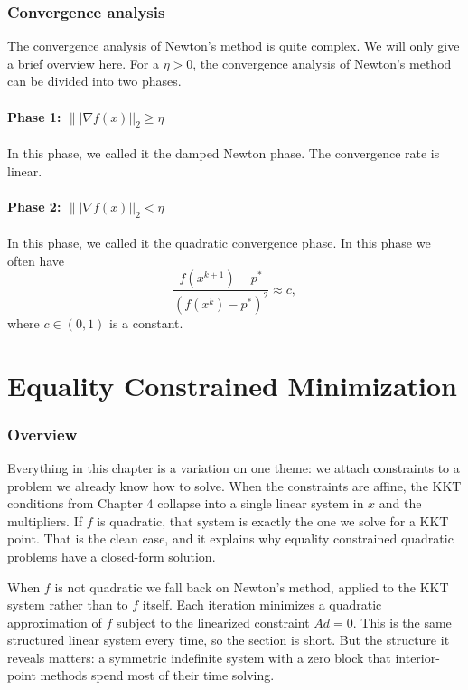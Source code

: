 \documentclass[lang=en,color=blue,mode=fancy,titlestyle=hang]{elegantbook}
\begin{document}
\subsection{Convergence analysis}
The convergence analysis of Newton's method is quite complex. We will only give a brief overview here.
For a $\eta > 0$, the convergence analysis of Newton's method can be divided into two phases.

\subsubsection{Phase 1: $\||\nabla f(x)||_2 \geq \eta$} In this phase, we called it the damped Newton phase.
The convergence rate is linear.

\subsubsection{Phase 2: $\||\nabla f(x)||_2 < \eta$} In this phase, we called it the quadratic
convergence phase. In this phase we often have
\[
\frac{f(x^{k+1}) - p^*}{{(f(x^k) - p^*)}^2} \approx c,
\]
where $c \in (0, 1)$ is a constant.

\chapter{Equality Constrained Minimization}

\subsection*{Overview}

Everything in this chapter is a variation on one theme: we attach constraints to a problem
we already know how to solve. When the constraints are affine, the KKT conditions from
Chapter 4 collapse into a single linear system in $x$ and the multipliers. If $f$ is
quadratic, that system is exactly the one we solve for a KKT point. That is the clean case,
and it explains why equality constrained quadratic problems have a closed-form solution.

When $f$ is not quadratic we fall back on Newton's method, applied to the KKT system rather
than to $f$ itself. Each iteration minimizes a quadratic approximation of $f$ subject to
the linearized constraint $Ad = 0$. This is the same structured linear system every time,
so the section is short. But the structure it reveals matters: a symmetric indefinite
system with a zero block that interior-point methods spend most of their time solving.
\end{document}
